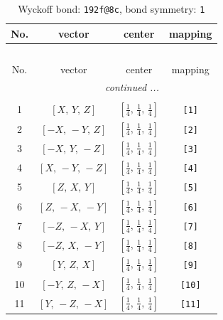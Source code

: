 \documentclass[fleqn,8pt]{jsarticle}
\begin{document}
\begin{longtable}{cccc}
\caption{Wyckoff bond: {\tt 192f@8c}, bond symmetry: {\tt 1}}
 \\
 \hline \hline
No. & vector & center & mapping \\ \hline \endfirsthead

\multicolumn{3}{l}{\tablename\ \thetable{}} \\
 \hline \hline
No. & vector & center & mapping \\ \hline \endhead

 \hline \hline
\multicolumn{3}{r}{\footnotesize\it continued ...} \\ \endfoot

 \hline \hline
\multicolumn{3}{r}{} \\ \endlastfoot

1 & $\left[ X,\, Y,\, Z \right]$ & $\left[ \frac{1}{4},\, \frac{1}{4},\, \frac{1}{4} \right]$ & {\tt [1]} \\ \hline
2 & $\left[ - X,\, - Y,\, Z \right]$ & $\left[ \frac{1}{4},\, \frac{1}{4},\, \frac{1}{4} \right]$ & {\tt [2]} \\ \hline
3 & $\left[ - X,\, Y,\, - Z \right]$ & $\left[ \frac{1}{4},\, \frac{1}{4},\, \frac{1}{4} \right]$ & {\tt [3]} \\ \hline
4 & $\left[ X,\, - Y,\, - Z \right]$ & $\left[ \frac{1}{4},\, \frac{1}{4},\, \frac{1}{4} \right]$ & {\tt [4]} \\ \hline
5 & $\left[ Z,\, X,\, Y \right]$ & $\left[ \frac{1}{4},\, \frac{1}{4},\, \frac{1}{4} \right]$ & {\tt [5]} \\ \hline
6 & $\left[ Z,\, - X,\, - Y \right]$ & $\left[ \frac{1}{4},\, \frac{1}{4},\, \frac{1}{4} \right]$ & {\tt [6]} \\ \hline
7 & $\left[ - Z,\, - X,\, Y \right]$ & $\left[ \frac{1}{4},\, \frac{1}{4},\, \frac{1}{4} \right]$ & {\tt [7]} \\ \hline
8 & $\left[ - Z,\, X,\, - Y \right]$ & $\left[ \frac{1}{4},\, \frac{1}{4},\, \frac{1}{4} \right]$ & {\tt [8]} \\ \hline
9 & $\left[ Y,\, Z,\, X \right]$ & $\left[ \frac{1}{4},\, \frac{1}{4},\, \frac{1}{4} \right]$ & {\tt [9]} \\ \hline
10 & $\left[ - Y,\, Z,\, - X \right]$ & $\left[ \frac{1}{4},\, \frac{1}{4},\, \frac{1}{4} \right]$ & {\tt [10]} \\ \hline
11 & $\left[ Y,\, - Z,\, - X \right]$ & $\left[ \frac{1}{4},\, \frac{1}{4},\, \frac{1}{4} \right]$ & {\tt [11]} \\ \hline

\end{longtable}
\end{document}
